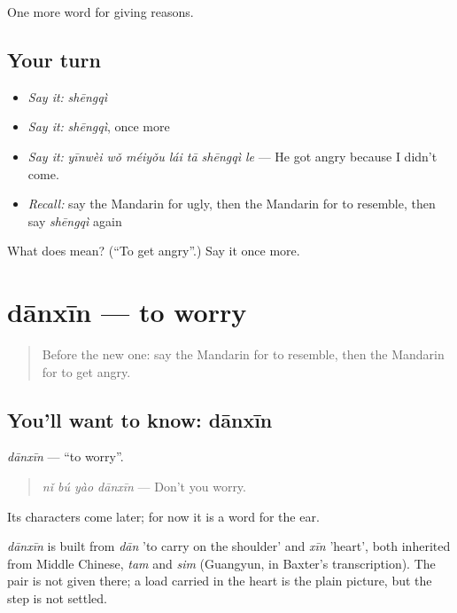 \begin{grammarlens}[title={What you've built}]
One more word for giving reasons.
\end{grammarlens}

\subsection*{Your turn}
\begin{itemize}
\raggedright
  \item \emph{Say it:} \emph{shēngqì}
  \item \emph{Say it:} \emph{shēngqì}, once more
  \item \emph{Say it:} \emph{yīnwèi wǒ méiyǒu lái tā shēngqì le} — He got angry because I didn't come.
  \item \emph{Recall:} say the Mandarin for ugly, then the Mandarin for to resemble, then say \emph{shēngqì} again
\end{itemize}

\begin{tcolorbox}[breakable,colback=teal!4,colframe=teal!35!black,title={Before you move on}]
What does  mean? (\textquotedblleft{}To get angry\textquotedblright{}.) Say it once more.
\end{tcolorbox}
\section[dānxīn]{dānxīn — to worry}

\label{lesson:ZH-C125-danxin}



\begin{quote}
Before the new one: say the Mandarin for to resemble, then the Mandarin for to get angry.
\end{quote}

\subsection*{You'll want to know: dānxīn}
\emph{dānxīn} — \textquotedblleft{}to worry\textquotedblright{}.

\begin{quote}
\emph{nǐ bú yào dānxīn} — Don't you worry.
\end{quote}

Its characters come later; for now it is a word for the ear.

\begin{cousinweb}
\emph{dānxīn} is built from \emph{dān} 'to carry on the shoulder' and \emph{xīn} 'heart', both inherited from Middle Chinese, \emph{tam} and \emph{sim} (Guangyun, in Baxter's transcription). The pair is not given there; a load carried in the heart is the plain picture, but the step is not settled.
\end{cousinweb}

